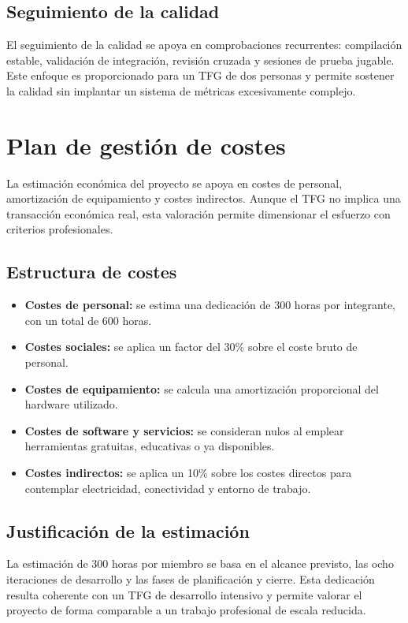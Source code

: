 \subsection{Seguimiento de la calidad}
El seguimiento de la calidad se apoya en comprobaciones recurrentes: compilación estable,
validación de integración, revisión cruzada y sesiones de prueba jugable. Este enfoque es
proporcionado para un TFG de dos personas y permite sostener la calidad sin implantar un
sistema de métricas excesivamente complejo.

\section{Plan de gestión de costes}
La estimación económica del proyecto se apoya en costes de personal, amortización de
equipamiento y costes indirectos. Aunque el TFG no implica una transacción económica real,
esta valoración permite dimensionar el esfuerzo con criterios profesionales.

\subsection{Estructura de costes}
\begin{itemize}
    \item \textbf{Costes de personal:} se estima una dedicación de 300 horas por integrante,
    con un total de 600 horas.
    \item \textbf{Costes sociales:} se aplica un factor del 30\% sobre el coste bruto de
    personal.
    \item \textbf{Costes de equipamiento:} se calcula una amortización proporcional del
    hardware utilizado.
    \item \textbf{Costes de software y servicios:} se consideran nulos al emplear
    herramientas gratuitas, educativas o ya disponibles.
    \item \textbf{Costes indirectos:} se aplica un 10\% sobre los costes directos para
    contemplar electricidad, conectividad y entorno de trabajo.
\end{itemize}

\subsection{Justificación de la estimación}
La estimación de 300 horas por miembro se basa en el alcance previsto, las ocho iteraciones
de desarrollo y las fases de planificación y cierre. Esta dedicación resulta coherente con
un TFG de desarrollo intensivo y permite valorar el proyecto de forma comparable a un
trabajo profesional de escala reducida.
